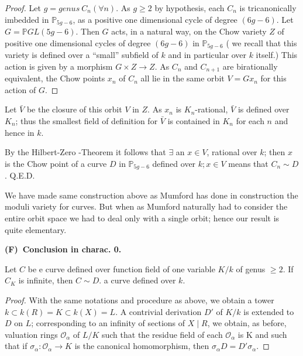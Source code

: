 \begin{proof}%
  Let $g=genus~ C_n(\forall n)$. As $g\geq 2$ by hypothesis, each
  $C_n$ is tricanonically  
  imbedded in $\mathbb{P}_{5g-6}$, as a positive one dimensional cycle
  of degree $(6g-6)$. Let $G=\mathbb{P}GL(5g-6)$. Then $G$ acts, in a
  natural way, on the Chow variety $Z$ of positive one  dimensional
  cycles  of degree $(6g-6)$ in $\mathbb{P}_{5g-6}$ ( we recall that
  this variety is defined over a ``small'' subfield of $k$ and in
  particular over $k$ itself.) This action is given by a morphism $G
  \times Z \longrightarrow Z$. As $C_n$ and $C_{n+1}$ are birationally
  equivalent, the Chow points $x_n$ of $C_n$ all lie in the same orbit
  $V=Gx_n$ for this action of $G$. 
\end{proof}

Let $\bar{V}$ be the closure of this orbit $V$ in $Z$. As $x_n$ is
$K_n$-rational, $\bar{V}$  is defined over $K_n$; thus the smallest
field of definition for $\bar{V}$ is contained in $K_n$ for each $n$
and hence in  $k$. 

By the Hilbert-Zero -Theorem it follows that $\exists$ an $x \in V$,
rational over $k$; then $x$ is the Chow point of a curve $D$ in
$\mathbb{P}_{5g-6}$ defined over $k; x \in V$ means that $C_n \sim
D$. \hfill{Q.E.D.}  

\begin{remark*}%
  We have made same construction above as Mumford has done in
  construction the moduli variety for curves. But when as Mumford
  naturally had to consider the entire orbit space we had to deal only  with  a
  single orbit; hence our result is quite elementary. 
\end{remark*}

\noindent
\medskip
\textbf{(F)~Conclusion in charac. 0.}\pageoriginale

\begin{proposition}\label{chap3:sec2:prop4}%
  Let $C$ be e curve defined over function field of one variable $K/k$
  of genus $\geq 2$. If $C_K$ is infinite, then $C\sim D$. a curve
  defined over $k$.  
\end{proposition}
 
\begin{proof} %
  With the same notations and procedure as above, we obtain a tower
  $k\subset k(R)=K \subset k (X)=L$. A contrivial derivation $D'$ of
  $K/k$ is extended to $D$ on $L$; corresponding to an infinity of
  sections of $X\mid R$, we obtain, as before, valuation rings
  $\mathscr{O}_\alpha $ of $L/K$ such that the residue field of each
  $\mathscr{O}_\alpha $ is K and such that if $\sigma_\alpha
  :\mathscr{O}_\alpha  \longrightarrow K$ is the canonical
  homomorphism, then $\sigma_\alpha  D=D' \sigma_\alpha$. 
\end{proof}

